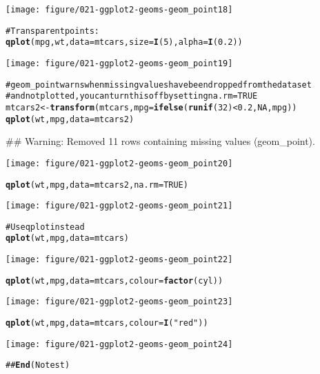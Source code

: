 \documentclass[a4paper,titlepage]{tufte-handout}\usepackage{graphicx, color}
\makeatletter
\def\maxwidth{ %
  \ifdim\Gin@nat@width>\linewidth
    \linewidth
  \else
    \Gin@nat@width
  \fi
}
\newcommand{\hlfunctioncall}[1]{\textcolor[rgb]{0.501960784313725,0,0.329411764705882}{\textbf{#1}}}%
\newcommand{\hlstring}[1]{\textcolor[rgb]{0.6,0.6,1}{#1}}%
\newcommand{\hlcomment}[1]{\textcolor[rgb]{0.180392156862745,0.6,0.341176470588235}{#1}}%
\newenvironment{kframe}{%
 \def\at@end@of@kframe{}%
 \ifinner\ifhmode%
  \def\at@end@of@kframe{\end{minipage}}%
  \begin{minipage}{\columnwidth}%
 \fi\fi%
 \def\FrameCommand##1{\hskip\@totalleftmargin \hskip-\fboxsep
 \colorbox{shadecolor}{##1}\hskip-\fboxsep
     \hskip-\linewidth \hskip-\@totalleftmargin \hskip\columnwidth}%
 \MakeFramed {\advance\hsize-\width
   \@totalleftmargin\z@ \linewidth\hsize
   \@setminipage}}%
 {\par\unskip\endMakeFramed%
 \at@end@of@kframe}
\newenvironment{knitrout}{}{} %
\makeatother
\begin{document}
\begin{knitrout}
\begin{kframe}
\end{kframe}\texttt{[image: figure/021-ggplot2-geoms-geom\_point18]} \begin{kframe}\begin{alltt}
\hlcomment{# Transparent points:}
\hlfunctioncall{qplot}(mpg, wt, data = mtcars, size = \hlfunctioncall{I}(5), alpha = \hlfunctioncall{I}(0.2))
\end{alltt}
\end{kframe}\texttt{[image: figure/021-ggplot2-geoms-geom\_point19]} \begin{kframe}\begin{alltt}
\hlcomment{# geom_point warns when missing values have been dropped from the data set}
\hlcomment{# and not plotted, you can turn this off by setting na.rm = TRUE}
mtcars2 <- \hlfunctioncall{transform}(mtcars, mpg = \hlfunctioncall{ifelse}(\hlfunctioncall{runif}(32) < 0.2, NA, mpg))
\hlfunctioncall{qplot}(wt, mpg, data = mtcars2)
\end{alltt}


{\ttfamily\noindent\textcolor{warningcolor}{\#\# Warning: Removed 11 rows containing missing values (geom\_point).}}\end{kframe}\texttt{[image: figure/021-ggplot2-geoms-geom\_point20]} \begin{kframe}\begin{alltt}
\hlfunctioncall{qplot}(wt, mpg, data = mtcars2, na.rm = TRUE)
\end{alltt}
\end{kframe}\texttt{[image: figure/021-ggplot2-geoms-geom\_point21]} \begin{kframe}\begin{alltt}
\hlcomment{# Use qplot instead}
\hlfunctioncall{qplot}(wt, mpg, data = mtcars)
\end{alltt}
\end{kframe}\texttt{[image: figure/021-ggplot2-geoms-geom\_point22]} \begin{kframe}\begin{alltt}
\hlfunctioncall{qplot}(wt, mpg, data = mtcars, colour = \hlfunctioncall{factor}(cyl))
\end{alltt}
\end{kframe}\texttt{[image: figure/021-ggplot2-geoms-geom\_point23]} \begin{kframe}\begin{alltt}
\hlfunctioncall{qplot}(wt, mpg, data = mtcars, colour = \hlfunctioncall{I}(\hlstring{"red"}))
\end{alltt}
\end{kframe}\texttt{[image: figure/021-ggplot2-geoms-geom\_point24]} \begin{kframe}\begin{alltt}
\hlcomment{## \hlfunctioncall{End}(No test)}
\end{alltt}
\end{kframe}
\end{knitrout}
\end{document}
